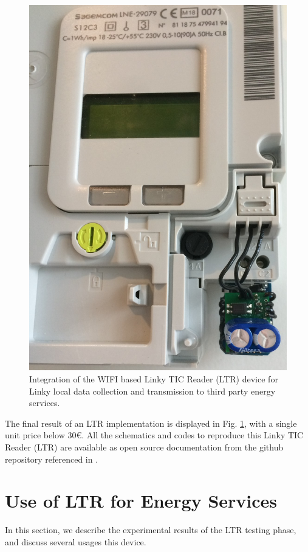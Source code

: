 \documentclass[conference]{IEEEtran}
\begin{document}
 
 \begin{figure}[h]
 	\centering
 	\includegraphics[width=0.5\columnwidth]{Images/dongle_Linky.jpg}
 	\caption{Integration of the WIFI based Linky TIC Reader (LTR) device for Linky local data collection and transmission to third party energy services.}
 	\label{Fig:dongle_Linky}
 \end{figure}
 
 
 
 The final result of an LTR implementation is displayed in Fig. \ref{Fig:dongle_Linky}, with a single unit price below 30€. All the schematics and codes to reproduce this Linky TIC Reader (LTR) are  available as open source documentation from the github repository referenced in \cite{github:LTR}.





\section{Use of LTR for Energy Services}
\label{section:experiments}
In this section, we describe the experimental results of the LTR testing phase, and discuss several usages this device. 
\end{document}
